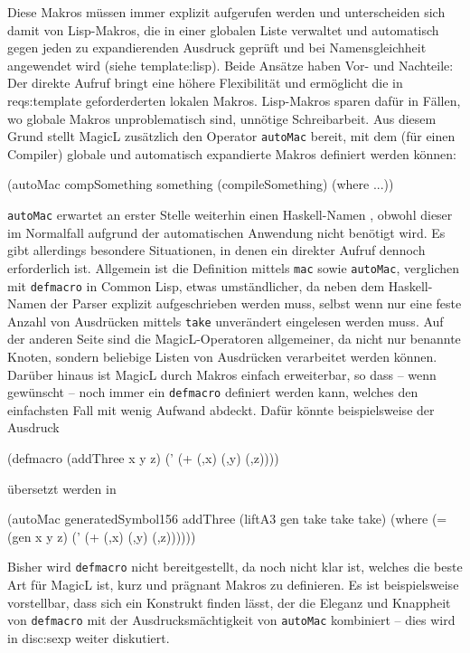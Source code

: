 \documentclass[12pt, a4paper, bibgerm]{scrbook}
\newenvironment{DIFnomarkup}{}{}
\newcommand\icode[1]{\lstinline?#1?}
\newcommand\sref{}
\newcommand{\sees}[1]{(siehe \sref{#1})}
\begin{document}
Diese Makros müssen immer explizit aufgerufen werden und unterscheiden
sich damit von Lisp-Makros, die in einer globalen Liste verwaltet und
automatisch gegen jeden zu expandierenden Ausdruck geprüft und bei
Namensgleichheit angewendet wird \sees{template:lisp}. Beide Ansätze
haben Vor- und Nachteile: Der direkte Aufruf bringt eine höhere
Flexibilität und ermöglicht die in \sref{reqs:template} geforderderten
lokalen Makros. Lisp-Makros sparen dafür in Fällen, wo globale Makros
unproblematisch sind, unnötige Schreibarbeit. Aus diesem Grund stellt
MagicL zusätzlich den Operator \icode{autoMac} bereit, mit dem (für
einen Compiler) globale und automatisch expandierte Makros definiert
werden können:
\begin{DIFnomarkup}\begin{code}
(autoMac compSomething something
    (compileSomething)
  (where ...))
\end{code}\end{DIFnomarkup}
\icode{autoMac} erwartet an erster Stelle weiterhin einen Haskell-Namen
, obwohl dieser im Normalfall aufgrund der automatischen Anwendung nicht
benötigt wird. Es gibt allerdings besondere Situationen, in denen ein
direkter Aufruf dennoch erforderlich ist. Allgemein ist die Definition
mittels \icode{mac} sowie \icode{autoMac}, verglichen mit
\icode{defmacro} in Common Lisp, etwas umständlicher, da neben dem
Haskell-Namen der Parser explizit aufgeschrieben werden muss, selbst
wenn nur eine feste Anzahl von Ausdrücken mittels \icode{take}
unverändert eingelesen werden muss. Auf der anderen Seite sind die
MagicL-Operatoren allgemeiner, da nicht nur benannte Knoten, sondern
beliebige Listen von Ausdrücken verarbeitet werden können. Darüber
hinaus ist MagicL durch Makros einfach erweiterbar, so dass -- wenn
gewünscht -- noch immer ein \icode{defmacro} definiert werden kann,
welches den einfachsten Fall mit wenig Aufwand abdeckt. Dafür könnte
beispielsweise der Ausdruck
\begin{DIFnomarkup}\begin{code}
(defmacro (addThree x y z)
  (' (+ (,x) (,y) (,z))))
\end{code}\end{DIFnomarkup}
übersetzt werden in
\begin{DIFnomarkup}\begin{code}
(autoMac generatedSymbol156 addThree
   (liftA3 gen take take take)
  (where (= (gen x y z)
            (' (+ (,x) (,y) (,z))))))
\end{code}\end{DIFnomarkup}
Bisher wird \icode{defmacro} nicht bereitgestellt, da noch nicht klar
ist, welches die beste Art für MagicL ist, kurz und prägnant Makros zu
definieren. Es ist beispielsweise vorstellbar, dass sich ein Konstrukt
finden lässt, der die Eleganz und Knappheit von \icode{defmacro} mit der
Ausdrucksmächtigkeit von \icode{autoMac} kombiniert -- dies wird in
\sref{disc:sexp} weiter diskutiert.
\end{document}
